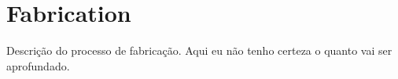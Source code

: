 \chapter{Fabrication}
Descrição do processo de fabricação. Aqui eu não tenho certeza o quanto vai ser aprofundado.  